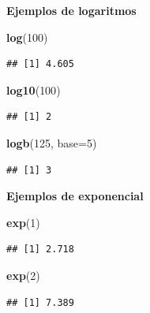 \documentclass[10pt,]{krantz}
\makeatletter
\newenvironment{Shaded}{\begin{snugshade}}{\end{snugshade}}
\newcommand{\KeywordTok}[1]{\textcolor[rgb]{0.13,0.29,0.53}{\textbf{#1}}}
\newcommand{\DataTypeTok}[1]{\textcolor[rgb]{0.13,0.29,0.53}{#1}}
\newcommand{\DecValTok}[1]{\textcolor[rgb]{0.00,0.00,0.81}{#1}}
\newcommand{\NormalTok}[1]{#1}
\newenvironment{kframe}{%
\medskip{}
\setlength{\fboxsep}{.8em}
 \def\at@end@of@kframe{}%
 \ifinner\ifhmode%
  \def\at@end@of@kframe{\end{minipage}}%
  \begin{minipage}{\columnwidth}%
 \fi\fi%
 \def\FrameCommand##1{\hskip\@totalleftmargin \hskip-\fboxsep
 \colorbox{shadecolor}{##1}\hskip-\fboxsep
     \hskip-\linewidth \hskip-\@totalleftmargin \hskip\columnwidth}%
 \MakeFramed {\advance\hsize-\width
   \@totalleftmargin\z@ \linewidth\hsize
   \@setminipage}}%
 {\par\unskip\endMakeFramed%
 \at@end@of@kframe}
\renewenvironment{Shaded}{\begin{kframe}}{\end{kframe}}
\makeatother
\begin{document}
\textbf{Ejemplos de logaritmos}

\begin{Shaded}
\begin{Highlighting}[]
\KeywordTok{log}\NormalTok{(}\DecValTok{100}\NormalTok{)}
\end{Highlighting}
\end{Shaded}

\begin{verbatim}
## [1] 4.605
\end{verbatim}

\begin{Shaded}
\begin{Highlighting}[]
\KeywordTok{log10}\NormalTok{(}\DecValTok{100}\NormalTok{)}
\end{Highlighting}
\end{Shaded}

\begin{verbatim}
## [1] 2
\end{verbatim}

\begin{Shaded}
\begin{Highlighting}[]
\KeywordTok{logb}\NormalTok{(}\DecValTok{125}\NormalTok{, }\DataTypeTok{base=}\DecValTok{5}\NormalTok{)}
\end{Highlighting}
\end{Shaded}

\begin{verbatim}
## [1] 3
\end{verbatim}

\textbf{Ejemplos de exponencial}

\begin{Shaded}
\begin{Highlighting}[]
\KeywordTok{exp}\NormalTok{(}\DecValTok{1}\NormalTok{)}
\end{Highlighting}
\end{Shaded}

\begin{verbatim}
## [1] 2.718
\end{verbatim}

\begin{Shaded}
\begin{Highlighting}[]
\KeywordTok{exp}\NormalTok{(}\DecValTok{2}\NormalTok{)}
\end{Highlighting}
\end{Shaded}

\begin{verbatim}
## [1] 7.389
\end{verbatim}
\end{document}
